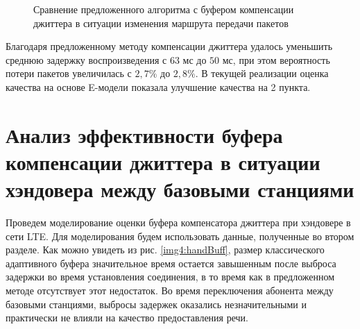 \pgfplotsset{width=15cm, height=10cm, compat=1.3}
\begin{figure} [!ht]
  \center
{}
\caption{Сравнение предложенного алгоритма с буфером компенсации джиттера \cite{Ramjee} в ситуации изменения маршрута передачи пакетов}
  \label{img4:routeBuff}
\end{figure}





Благодаря предложенному методу компенсации джиттера удалось уменьшить среднюю задержку воспроизведения с $63$ мс до $50$ мс, при этом вероятность потери пакетов увеличилась с $2{,}7\%$ до $2{,}8\%$.
В текущей реализации оценка качества на основе E-модели показала улучшение качества на 2 пункта.












\section{Анализ эффективности буфера компенсации джиттера в ситуации хэндовера между базовыми станциями} \label{sect4}

Проведем моделирование оценки буфера компенсатора джиттера при хэндовере в сети LTE. 
Для моделирования будем использовать данные, полученные во втором разделе. 
Как можно увидеть из рис. \ref{img4:handBuff}, размер классического адаптивного буфера значительное время остается завышенным после выброса задержки во время установления соединения, в то время как в предложенном методе отсутствует этот недостаток.
Во время переключения абонента между базовыми станциями, выбросы задержек оказались незначительными и практически не влияли на качество предоставления речи.


